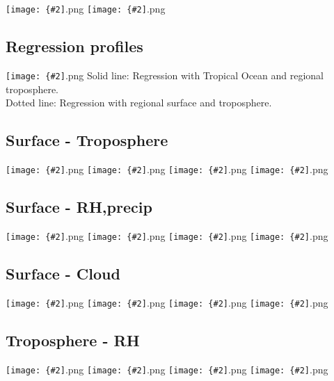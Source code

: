 \documentclass[12pt,a4paper]{article}
\newcommand{\pngfig}[2][0.5]{\texttt{[image: \{\#2]}.png}}
\begin{document}
\section{}

\pngfig[0.5]{phi_trop_4ysl}
\pngfig[0.5]{phi_rcm_4ysl}

\subsection{Regression profiles}
\pngfig[1.0]{reg_profiles}
Solid line: Regression with Tropical Ocean and regional troposphere.\\

Dotted line: Regression with regional surface and troposphere.\\

\subsection{Surface - Troposphere}
\pngfig[0.5]{reg_T_sfc_T_tropo}
\pngfig[0.5]{reg_T_sfc_RH_tropo}
\pngfig[0.5]{cor_T_sfc_T_tropo}
\pngfig[0.5]{cor_T_sfc_RH_tropo}
\subsection{Surface - RH,precip}
\pngfig[0.5]{reg_T_sfc_RH_sfc}
\pngfig[0.5]{reg_T_sfc_Precip}
\pngfig[0.5]{cor_T_sfc_RH_sfc}
\pngfig[0.5]{cor_T_sfc_Precip}
\subsection{Surface - Cloud}
\pngfig[0.5]{reg_T_sfc_Cld_High}
\pngfig[0.5]{reg_T_sfc_Cld_Low}
\pngfig[0.5]{cor_T_sfc_Cld_High}
\pngfig[0.5]{cor_T_sfc_Cld_Low}
\subsection{Troposphere - RH}
\pngfig[0.5]{reg_T_tropo_RH_sfc}
\pngfig[0.5]{reg_T_tropo_RH_tropo}
\pngfig[0.5]{cor_T_tropo_RH_sfc}
\pngfig[0.5]{cor_T_tropo_RH_tropo}
\end{document}
